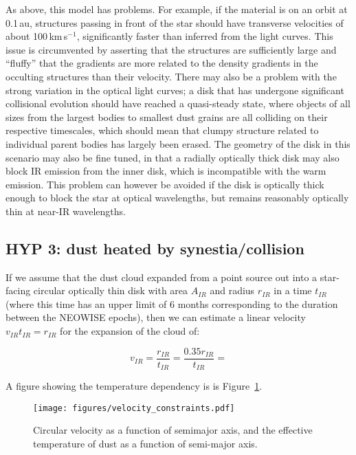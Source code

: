 \documentclass{aa}
\begin{document}
As above, this model has problems.
%
For example, if the material is on an orbit at 0.1\,au, structures passing in front of the star should have transverse velocities of about 100\,km\,s$^{-1}$, significantly faster than inferred from the light curves.
%
This issue is circumvented by asserting that the structures are sufficiently large and ``fluffy'' that the gradients are more related to the density gradients in the occulting structures than their velocity.
%
There may also be a problem with the strong variation in the optical light curves; a disk that has undergone significant collisional evolution should have reached a quasi-steady state, where objects of all sizes from the largest bodies to smallest dust grains are all colliding on their respective timescales, which should mean that clumpy structure related to individual parent bodies has largely been erased.
%
The geometry of the disk in this scenario may also be fine tuned, in that a radially optically thick disk may also block IR emission from the inner disk, which is incompatible with the warm emission. This problem can however be avoided if the disk is optically thick enough to block the star at optical wavelengths, but remains reasonably optically thin at near-IR wavelengths.

\subsection{HYP 3: dust heated by synestia/collision} 

If we assume that the dust cloud expanded from a point source out into a star-facing circular optically thin disk with area $A_{IR}$ and radius $r_{IR}$ in a time $t_{IR}$ (where this time has an upper limit of 6 months corresponding to the duration between the NEOWISE epochs), then we can estimate a linear velocity $v_{IR} t_{IR} = r_{IR}$ for the expansion of the cloud of:

$$v_{IR} = \frac{r_{IR}}{t_{IR}} = \frac{0.35 r_{IR}}{t_{IR}} = $$

A figure showing the temperature dependency is is Figure~\ref{fig:veloc_cons}.

\begin{figure}
    \begin{centering}
    \texttt{[image: figures/velocity\_constraints.pdf]}
    \caption{Circular velocity as a function of semimajor axis, and the effective temperature of dust as a function of semi-major axis.
              }
    \label{fig:veloc_cons}
    \end{centering}
\end{figure}
\end{document}
